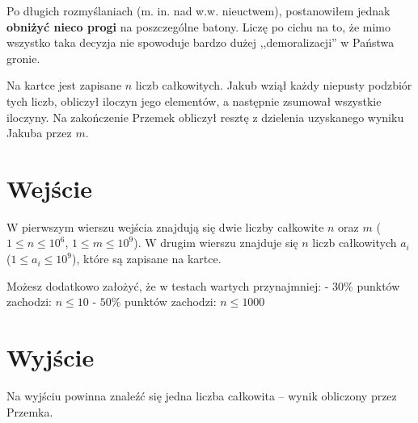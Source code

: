 \documentclass[zad,zawodnik,utf8]{sinol}
\begin{document}
\begin{tasktext}
Po długich rozmyślaniach (m. in. nad w.w. nieuctwem), postanowiłem jednak \textbf{obniżyć nieco progi} na poszczególne batony. Liczę po cichu na to, że mimo wszystko taka decyzja nie spowoduje bardzo dużej ,,demoralizacji'' w Państwa gronie.

Na kartce jest zapisane $n$ liczb całkowitych. Jakub wziął każdy niepusty podzbiór tych liczb, obliczył iloczyn jego elementów, a następnie zsumował wszystkie iloczyny. Na zakończenie Przemek obliczył resztę z dzielenia uzyskanego wyniku Jakuba przez $m$.

  \section{Wejście}
W pierwszym wierszu wejścia znajdują się dwie liczby całkowite $n$ oraz $m$ ($1 \leq n \leq 10^6$, $1 \leq m \leq 10^9$). W drugim wierszu znajduje się $n$ liczb całkowitych $a_i$ ($1 \leq a_i \leq 10^9$), które są zapisane na kartce.

Możesz dodatkowo założyć, że w testach wartych przynajmniej:\newline
- $30\%$ punktów zachodzi: $n \leq 10$\newline
- $50\%$ punktów zachodzi: $n \leq 1000$\newline

  \section{Wyjście}
Na wyjściu powinna znaleźć się jedna liczba całkowita -- wynik obliczony przez Przemka.

\makecompactexample

\end{tasktext}
\end{document}
